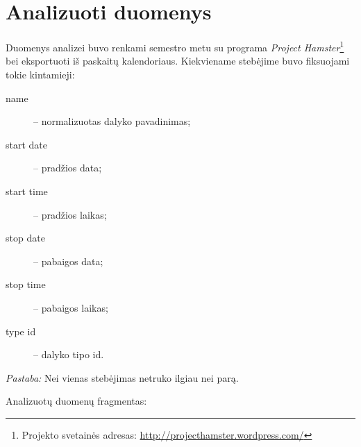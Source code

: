 \chapter{Analizuoti duomenys}

Duomenys analizei buvo renkami semestro metu su programa
\emph{Project Hamster}\footnote{
Projekto svetainės adresas: \url{http://projecthamster.wordpress.com/}}
bei eksportuoti iš paskaitų kalendoriaus. Kiekviename stebėjime buvo
fiksuojami tokie kintamieji:
\begin{description}
  \item[name] – normalizuotas dalyko pavadinimas;
  \item[start date] – pradžios data;
  \item[start time] – pradžios laikas;
  \item[stop date] – pabaigos data;
  \item[stop time] – pabaigos laikas;
  \item[type id] – dalyko tipo id.
\end{description}

\emph{Pastaba:} Nei vienas stebėjimas netruko ilgiau nei parą.

Analizuotų duomenų fragmentas:

